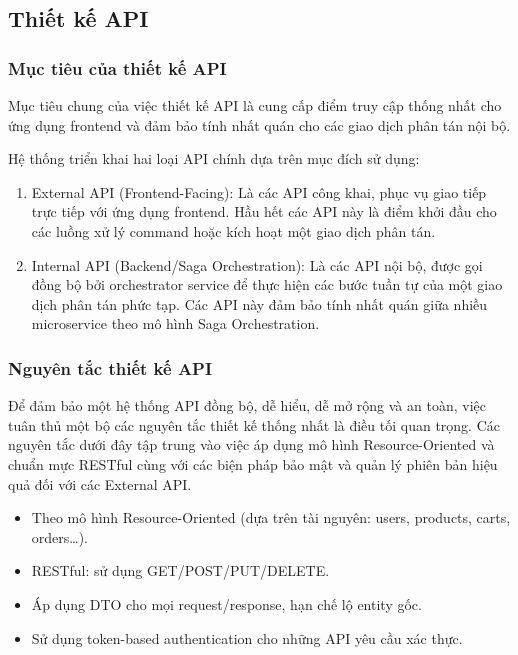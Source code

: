 \subsection{Thiết kế API}

\subsubsection{Mục tiêu của thiết kế API}

Mục tiêu chung của việc thiết kế API là cung cấp điểm truy cập thống nhất cho ứng dụng frontend và đảm bảo tính nhất quán cho các giao dịch phân tán nội bộ.

Hệ thống triển khai hai loại API chính dựa trên mục đích sử dụng:

\begin{enumerate}
    \item External API (Frontend-Facing): Là các API công khai, phục vụ giao tiếp trực tiếp với ứng dụng frontend. Hầu hết các API này là điểm khởi đầu cho các luồng xử lý command hoặc kích hoạt một giao dịch phân tán.
    \item Internal API (Backend/Saga Orchestration): Là các API nội bộ, được gọi đồng bộ bởi orchestrator service để thực hiện các bước tuần tự của một giao dịch phân tán phức tạp. Các API này đảm bảo tính nhất quán giữa nhiều microservice theo mô hình Saga Orchestration.
\end{enumerate}

\subsubsection{Nguyên tắc thiết kế API}

Để đảm bảo một hệ thống API đồng bộ, dễ hiểu, dễ mở rộng và an toàn, việc tuân thủ một bộ các nguyên tắc thiết kế thống nhất là điều tối quan trọng. Các nguyên tắc dưới đây tập trung vào việc áp dụng mô hình Resource-Oriented và chuẩn mực RESTful cùng với các biện pháp bảo mật và quản lý phiên bản hiệu quả đối với các External API.
\begin{itemize}
    \item Theo mô hình Resource-Oriented (dựa trên tài nguyên: users, products, carts, orders…).
    \item RESTful: sử dụng GET/POST/PUT/DELETE.
    \item Áp dụng DTO cho mọi request/response, hạn chế lộ entity gốc.
    \item Sử dụng token-based authentication cho những API yêu cầu xác thực.
\end{itemize}

